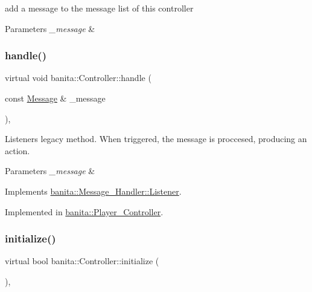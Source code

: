 add a message to the message list of this controller 


\begin{DoxyParams}{Parameters}
{\em \+\_\+message} & \\
\hline
\end{DoxyParams}
\mbox{\label{classbanita_1_1_controller_a2feb550d530941ed11312fbbb7730c80}} 
\subsubsection{\texorpdfstring{handle()}{handle()}}
{\footnotesize\ttfamily virtual void banita\+::\+Controller\+::handle (\begin{DoxyParamCaption}\item[{const \mbox{\hyperlink{classbanita_1_1_message}{Message}} \&}]{\+\_\+message }\end{DoxyParamCaption})\hspace{0.3cm}{\ttfamily [override]}, {}}



Listener\textquotesingle{}s legacy method. When triggered, the message is proccesed, producing an action. 


\begin{DoxyParams}{Parameters}
{\em \+\_\+message} & \\
\hline
\end{DoxyParams}


Implements \mbox{\hyperlink{structbanita_1_1_message___handler_1_1_listener_a2dfde040fbc7c8d2f17c6ba52722b749}{banita\+::\+Message\+\_\+\+Handler\+::\+Listener}}.



Implemented in \mbox{\hyperlink{classbanita_1_1_player___controller_a6c6aa3a387d36db7306ca557fbb100e6}{banita\+::\+Player\+\_\+\+Controller}}.

\mbox{\label{classbanita_1_1_controller_a3a3bc92a032f22f0cd20cbff0f89d175}} 
\subsubsection{\texorpdfstring{initialize()}{initialize()}}
{\footnotesize\ttfamily virtual bool banita\+::\+Controller\+::initialize (\begin{DoxyParamCaption}{ }\end{DoxyParamCaption})\hspace{0.3cm}{\ttfamily [override]}, {}}



